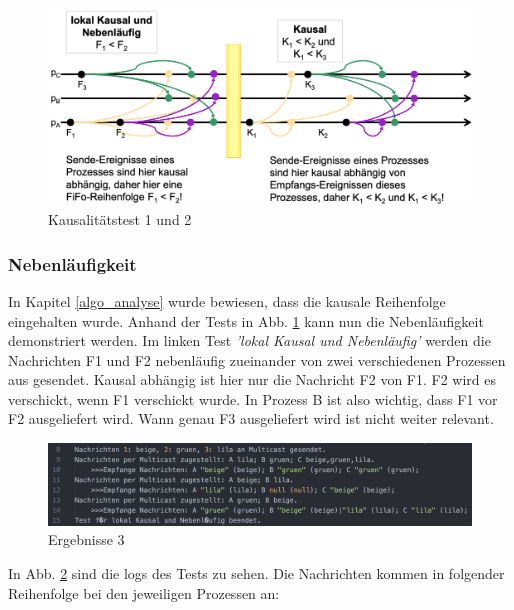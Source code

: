 \begin{figure}[htbp]
\begin{center}
\includegraphics[scale=0.25]{Latex/Bilder/Test1_2.png}
\caption{\label{test1_2} Kausalitätstest 1 und 2 \cite{Aufgabenstellung}}
\end{center}
\end{figure}

\subsubsection{Nebenläufigkeit}

In Kapitel \ref{algo_analyse} wurde bewiesen, dass die kausale Reihenfolge eingehalten wurde. Anhand der Tests in Abb. \ref{test1_2} kann nun die Nebenläufigkeit demonstriert werden. Im linken Test \textit{'lokal Kausal und Nebenläufig'} werden die Nachrichten F1 und F2 nebenläufig zueinander von zwei verschiedenen Prozessen aus gesendet. Kausal abhängig ist hier nur die Nachricht F2 von F1. F2 wird es verschickt, wenn F1 verschickt wurde. In Prozess B ist also wichtig, dass F1 vor F2 ausgeliefert wird. Wann genau F3 ausgeliefert wird ist nicht weiter relevant.

\begin{figure}[htbp]
\begin{center}
\includegraphics[scale=0.2]{Latex/Bilder/test1_1_results.png}
\caption{\label{test1_2_result} Ergebnisse 3}
\end{center}
\end{figure}

In Abb. \ref{test1_2_result} sind die logs des Tests zu sehen. Die Nachrichten kommen in folgender Reihenfolge bei den jeweiligen Prozessen an:

